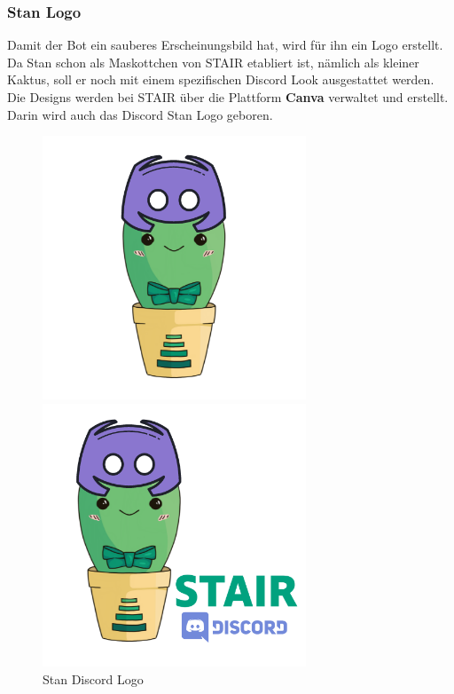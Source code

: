 \documentclass[a4paper, table]{article}
\begin{document}
\subsubsection{Stan Logo}
Damit der Bot ein sauberes Erscheinungsbild hat, wird für ihn ein Logo erstellt. 
Da Stan schon als Maskottchen von STAIR etabliert ist, nämlich als kleiner Kaktus, soll er noch mit einem spezifischen Discord Look ausgestattet werden.\\
Die Designs werden bei STAIR über die Plattform \textbf{Canva} verwaltet und erstellt. \autocite{noauthor_kostenloses_nodate}
Darin wird auch das Discord Stan Logo geboren.

\begin{figure}[h]
    \begin{minipage}[t]{0.5\textwidth}
        \includegraphics[width=0.7\textwidth]{img/StanDiscordLogoSolo.png}
    \end{minipage}
    \begin{minipage}[t]{0.5\textwidth}
        \includegraphics[width=0.7\textwidth]{img/StanDiscordLogo.png}
    \end{minipage}
    \caption{Stan Discord Logo}
    \label{fig:stan-discord-logo}
\end{figure}
\end{document}
